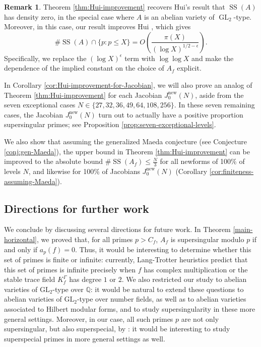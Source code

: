 \documentclass[11pt,letterpaper,reqno]{amsart}
\theoremstyle{definition}
\newtheorem{remark}[theorem]{Remark}
\numberwithin{equation}{section}
\numberwithin{figure}{section}
\numberwithin{table}{section}
\let\subsectiontemp\subsection
\renewcommand{\subsection}[1]{ 
    \subsectiontemp{#1} \hfill\vspace{0.5\linespacing} 
}
\newcommand{\nw}{\mathrm{new}}
\begin{document}
\begin{remark}
    Theorem \ref{thm:Hui-improvement} recovers Hui's result \cite[Theorem 1.1]{HuiSS2025} that $\operatorname{SS}(A)$ has density zero, in the special case where $A$ is an abelian variety of $\operatorname{GL}_2$-type. Moreover, in this case, our result improves Hui \cite[Theorem 2]{HuiSS2025}, which gives
    $$\# \operatorname{SS}(A) \cap \{ p : p \leq X\} = O\left( \frac{\pi(X)}{\left(\log X\right)^{1/2 - \epsilon}}  \right).$$
    Specifically, we replace the $(\log X)^\epsilon$ term with $\log \log X$ and make the dependence of the implied constant on the choice of $A_f$ explicit.

\end{remark}

In Corollary \ref{cor:Hui-improvement-for-Jacobian}, we will also prove an analog of Theorem \ref{thm:Hui-improvement} for each Jacobian $J_0^\nw(N)$, aside from the seven exceptional cases $N \in \{ 27, 32, 36, 49, 64, 108, 256\}$.
In these seven remaining cases, the Jacobian $J_0^\nw(N)$ turn out to actually have a positive proportion supersingular primes; see Proposition \ref{prop:seven-exceptional-levels}.

We also show that assuming the generalized Maeda conjecture (see Conjecture \ref{conj:gen-Maeda}), the upper bound in Theorem \ref{thm:Hui-improvement} can be improved to the absolute bound $\# \operatorname{SS}(A_f) \leq \frac{N}{3}$ for all newforms of 100\% of levels $N$, and likewise for 100\% of Jacobians $J_0^\nw(N)$ (Corollary \ref{cor:finiteness-assuming-Maeda}).

\subsection{Directions for further work}\label{subsection:further-work}

We conclude by discussing several directions for future work. In Theorem \ref{main-horizontal}, we proved that, for all primes $p > C_f$, $A_f$ is supersingular modulo $p$ if and only if $a_p(f)=0$. Thus, it would be interesting to determine whether this set of primes is finite or infinite: currently, Lang-Trotter heuristics predict that this set of primes is infinite precisely when $f$ has complex multiplication or the stable trace field $K_f^{\Gamma}$ has degree $1$ or $2$. We also restricted our study to abelian varieties of $\mathrm{GL}_2$-type over $\mathbb{Q}$: it would be natural to extend these questions to abelian varieties of $\mathrm{GL}_2$-type over number fields, as well as to abelian varieties associated to Hilbert modular forms, and to study supersingularity in these more general settings. Moreover, in our case, all such primes $p$ are not only supersingular, but also superspecial, by \cite[Lemma 2.2]{yu2011superspecial}: it would be interesting to study superspecial primes in more general settings as well.
\end{document}
